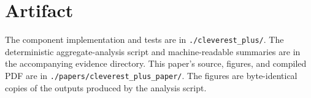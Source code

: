 \documentclass{article}
\begin{document}
\section*{Artifact}

The component implementation and tests are in \texttt{./cleverest\_plus/}.
The deterministic aggregate-analysis script and machine-readable summaries are
in the accompanying evidence directory.  This paper's source, figures, and
compiled PDF are in \texttt{./papers/cleverest\_plus\_paper/}.  The figures
are byte-identical copies of the outputs produced by the analysis script.



\end{document}
